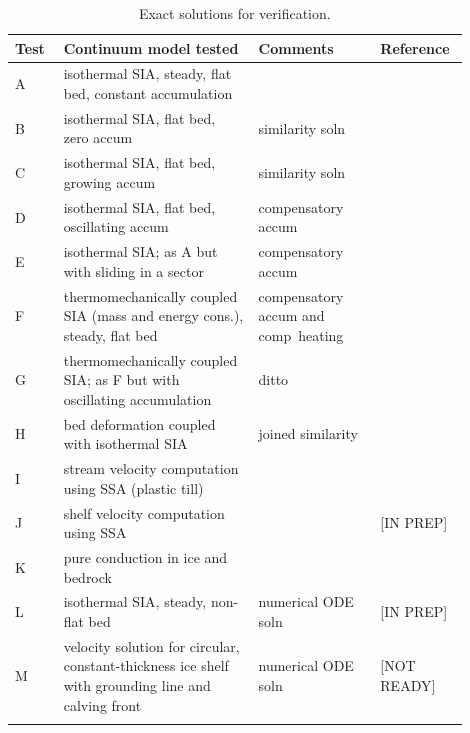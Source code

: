 \documentclass[11pt,final]{amsart}
\begin{document}
\begin{table}[ht]
\caption{Exact solutions for verification.}\label{tab:tests}
\small
\begin{tabular}{p{0.1\linewidth}p{0.4\linewidth}p{0.25\linewidth}p{0.15\linewidth}}\hline
\textbf{Test} & \textbf{Continuum model tested} & \textbf{Comments} & \textbf{Reference} \\ \hline
A & isothermal SIA, steady,  flat bed, constant accumulation &  & \cite{BLKCB} \\
B & isothermal SIA, flat bed, zero accum & similarity soln & \cite{BLKCB,Halfar83} \\
C & isothermal SIA, flat bed, growing accum & similarity soln & \cite{BLKCB} \\
D & isothermal SIA, flat bed, oscillating accum & compensatory accum & \cite{BLKCB} \\
E & isothermal SIA; as A  but with sliding in a sector &  compensatory accum & \cite{BLKCB} \\
F & thermomechanically coupled SIA (mass and energy cons.), steady, flat bed &  compensatory accum and comp~heating& \cite{BB,BBL} \\
G & thermomechanically coupled SIA; as F  but with oscillating accumulation  & ditto & \cite{BB,BBL} \\
H & bed deformation coupled with isothermal SIA & joined similarity & \cite{BLKfastearth} \\
I & stream velocity computation using SSA (plastic till) &  & \cite{SchoofStream,BBssasliding} \\
J & shelf velocity computation using SSA  &  & [IN PREP] \\
K & pure conduction in ice and bedrock & & \cite{BuelerTestK} \\
L & isothermal SIA, steady, non-flat bed & numerical ODE soln & [IN PREP] \\
M & velocity solution for circular, constant-thickness  ice shelf with grounding line and calving front & numerical ODE soln & [NOT READY] \\
\hline
\normalsize
\end{tabular}
\end{table}
\end{document}
